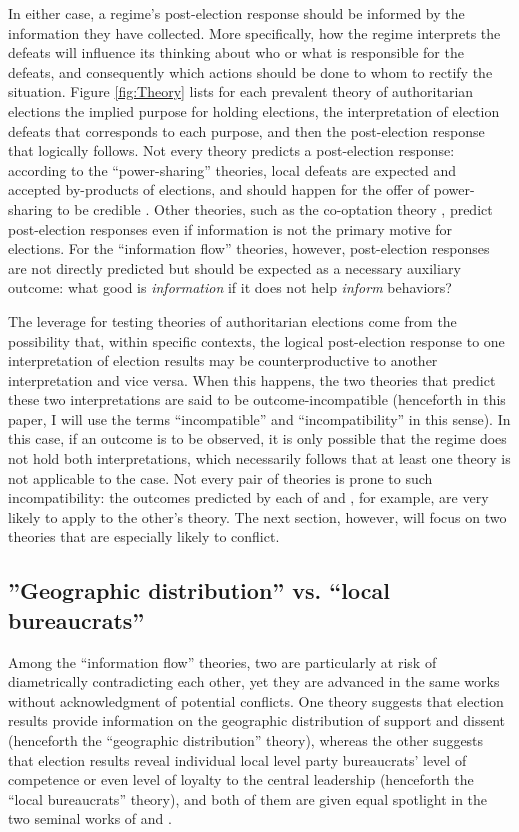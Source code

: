 \documentclass[12pt]{article}\usepackage[]{graphicx}\usepackage[]{color}
\newcommand{\1}{\mathbbm{1}}
\begin{document}
In either case, a regime's post-election response should be informed by the information they have collected. More specifically, how the regime interprets the defeats will influence its thinking about who or what is responsible for the defeats, and consequently which actions should be done to whom to rectify the situation. Figure \ref{fig:Theory} lists for each prevalent theory of authoritarian elections the implied purpose for holding elections, the interpretation of election defeats that corresponds to each purpose, and then the post-election response that logically follows. Not every theory predicts a post-election response: according to the ``power-sharing'' theories, local defeats are expected and accepted by-products of elections, and should happen for the offer of power-sharing to be credible \citep{AR2005, Cox2009}. Other theories, such as the co-optation theory \citep{LustOkar2005}, predict post-election responses even if information is not the primary motive for elections. For the ``information flow'' theories, however, post-election responses are not directly predicted but should be expected as a necessary auxiliary outcome: what good is \textit{information} if it does not help \textit{inform} behaviors?

The leverage for testing theories of authoritarian elections come from the possibility that, within specific contexts, the logical post-election response to one interpretation of election results may be counterproductive to another interpretation and vice versa. When this happens, the two theories that predict these two interpretations are said to be outcome-incompatible (henceforth in this paper, I will use the terms ``incompatible'' and ``incompatibility'' in this sense). In this case, if an outcome is to be observed, it is only possible that the regime does not hold both interpretations, which necessarily follows that at least one theory is not applicable to the case. Not every pair of theories is prone to such incompatibility: the outcomes predicted by each of \cite{Miller2015} and \cite{Geddes2005}, for example, are very likely to apply to the other's theory. The next section, however, will focus on two theories that are especially likely to conflict.

\subsection{''Geographic distribution'' vs. ``local bureaucrats''}
Among the ``information flow'' theories, two are particularly at risk of diametrically contradicting each other, yet they are advanced in the same works without acknowledgment of potential conflicts. One theory suggests that election results provide information on the geographic distribution of support and dissent (henceforth the ``geographic distribution'' theory), whereas the other suggests that election results reveal individual local level party bureaucrats' level of competence or even level of loyalty to the central leadership (henceforth the ``local bureaucrats'' theory), and both of them are given equal spotlight in the two seminal works of \cite{Magaloni2006} and \cite{Blaydes2008}. 
\end{document}
